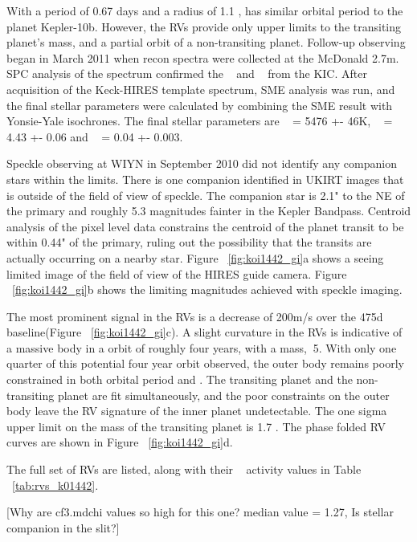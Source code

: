 \documentclass{emulateapj}
\begin{document}
With a period of 0.67 days and a radius  of 1.1 \rearth, {\koionefourfourtwo} has similar orbital period to the planet Kepler-10b. However, the RVs provide only upper limits to the transiting planet's mass, and a partial orbit of a non-transiting planet. Follow-up observing began in March 2011 when recon spectra were collected at the McDonald 2.7m. SPC analysis of the spectrum confirmed the \teff~ and \logg~ from the KIC. After acquisition of the Keck-HIRES template spectrum, SME analysis was run, and the final stellar parameters were calculated by combining the SME result with Yonsie-Yale isochrones. The final stellar parameters are \teff~ =  5476 +- 46K, \logg~ = 4.43 +- 0.06 and \feh~ = 0.04 +- 0.003. 

Speckle observing at WIYN in September 2010 did not identify any companion stars within the limits. There is one companion identified in UKIRT images that is outside of the field of view of speckle. The companion star is 2.1" to the NE of  the primary and roughly 5.3 magnitudes fainter in the Kepler Bandpass. Centroid analysis of the pixel level data constrains the centroid of the planet transit to be within 0.44" of the primary, ruling out the possibility that the transits are actually occurring on a nearby star. Figure ~\ref{fig:koi1442_gi}a shows a seeing limited image of the field of view of the HIRES guide camera.  Figure ~\ref{fig:koi1442_gi}b shows the limiting magnitudes achieved with speckle imaging.

 The most prominent signal in the RVs  is a decrease of 200m/s over the 475d baseline(Figure ~\ref{fig:koi1442_gi}c). A slight curvature in the RVs is indicative of a massive body in a orbit of roughly four years, with a mass, \msini$~$5\mjupe. With only one quarter of this potential four year orbit observed, the outer body remains poorly constrained in both orbital period and \msini.  The transiting planet and the non-transiting planet are fit simultaneously, and the poor constraints on the outer body leave the RV signature of the inner planet undetectable. The one sigma upper limit on the mass of the transiting planet is 1.7 \mearthe. The phase folded RV curves are shown in Figure ~\ref{fig:koi1442_gi}d.

The full set of RVs are listed, along with their \rphk~ activity values in Table ~\ref{tab:rvs_k01442}.

[Why are cf3.mdchi values so high for this one?  median value = 1.27, Is stellar companion in the slit?]

\subsection{\koionesixonetwo} %
\end{document}
